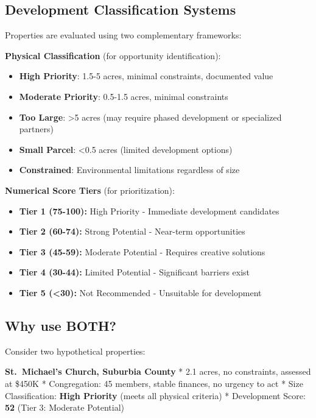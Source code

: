 \documentclass[
  letterpaper,
  DIV=11,
  numbers=noendperiod,
  oneside]{scrreprt}
\providecommand{\tightlist}{%
  \setlength{\itemsep}{0pt}\setlength{\parskip}{0pt}}
\begin{document}
\subsection{Development Classification
Systems}\label{development-classification-systems}

Properties are evaluated using two complementary frameworks:

\textbf{Physical Classification} (for opportunity identification):

\begin{itemize}
\tightlist
\item
  \textbf{High Priority}: 1.5-5 acres, minimal constraints, documented
  value
\item
  \textbf{Moderate Priority}: 0.5-1.5 acres, minimal constraints
\item
  \textbf{Too Large}: \textgreater5 acres (may require phased
  development or specialized partners)
\item
  \textbf{Small Parcel}: \textless0.5 acres (limited development
  options)
\item
  \textbf{Constrained}: Environmental limitations regardless of size
\end{itemize}

\textbf{Numerical Score Tiers} (for prioritization):

\begin{itemize}
\tightlist
\item
  \textbf{Tier 1 (75-100):} High Priority - Immediate development
  candidates
\item
  \textbf{Tier 2 (60-74):} Strong Potential - Near-term opportunities
\item
  \textbf{Tier 3 (45-59):} Moderate Potential - Requires creative
  solutions
\item
  \textbf{Tier 4 (30-44):} Limited Potential - Significant barriers
  exist
\item
  \textbf{Tier 5 (\textless30):} Not Recommended - Unsuitable for
  development
\end{itemize}

\subsection{Why use BOTH?}\label{why-use-both}

Consider two hypothetical properties:

\textbf{St.~Michael's Church, Suburbia County} * 2.1 acres, no
constraints, assessed at \$450K * Congregation: 45 members, stable
finances, no urgency to act * Size Classification: \textbf{High
Priority} (meets all physical criteria) * Development Score: \textbf{52}
(Tier 3: Moderate Potential)
\end{document}
